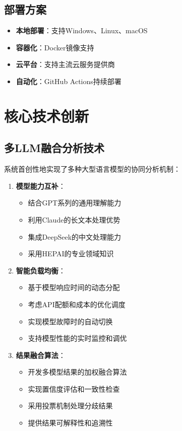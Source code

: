 \documentclass[12pt,a4paper]{article}
\begin{document}
\subsection{部署方案}
\begin{itemize}
    \item \textbf{本地部署}：支持Windows、Linux、macOS
    \item \textbf{容器化}：Docker镜像支持
    \item \textbf{云平台}：支持主流云服务提供商
    \item \textbf{自动化}：GitHub Actions持续部署
\end{itemize}

\section{核心技术创新}

\subsection{多LLM融合分析技术}
系统首创性地实现了多种大型语言模型的协同分析机制：

\begin{enumerate}
    \item \textbf{模型能力互补}：
        \begin{itemize}
            \item 结合GPT系列的通用理解能力
            \item 利用Claude的长文本处理优势
            \item 集成DeepSeek的中文处理能力
            \item 采用HEPAI的专业领域知识
        \end{itemize}
    
    \item \textbf{智能负载均衡}：
        \begin{itemize}
            \item 基于模型响应时间的动态分配
            \item 考虑API配额和成本的优化调度
            \item 实现模型故障时的自动切换
            \item 支持模型性能的实时监控和调优
        \end{itemize}
    
    \item \textbf{结果融合算法}：
        \begin{itemize}
            \item 开发多模型结果的加权融合算法
            \item 实现置信度评估和一致性检查
            \item 采用投票机制处理分歧结果
            \item 提供结果可解释性和追溯性
        \end{itemize}
\end{enumerate}
\end{document}
